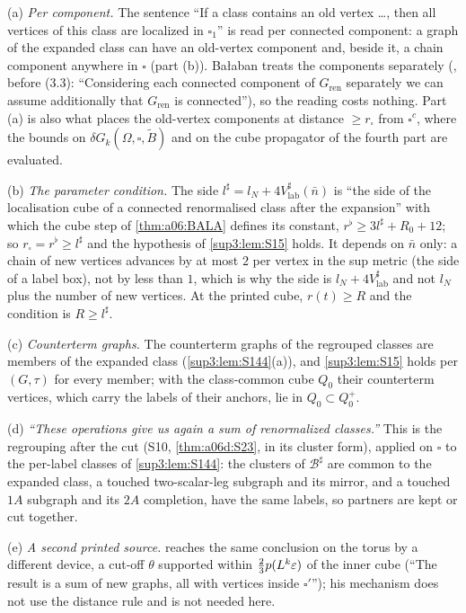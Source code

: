 \begin{remark}\label{sup3:rem:S15}
(a) \emph{Per component.} The sentence ``If a class contains an old vertex \dots, then all vertices of this class are localized in $\square_1$'' is read per connected component: a graph of the expanded class can have an old-vertex component and, beside it, a chain component anywhere in $\square$ (part (b)). Ba{\l}aban treats the components separately (\cite[p.~433]{Ba3}, before (3.3): ``Considering each connected component of $G_{\mathrm{ren}}$ separately we can assume additionally that $G_{\mathrm{ren}}$ is connected''), so the reading costs nothing. Part (a) is also what places the old-vertex components at distance $\ge r_\square$ from $\square^c$, where the bounds on $\delta G_k(\Omega,\square,\tilde B)$ and on the cube propagator of the fourth part are evaluated.

(b) \emph{The parameter condition.} The side $l^\sharp=l_N+4V^\sharp_{\mathrm{lab}}(\bar n)$ is ``the side of the localisation cube of a connected renormalised class after the expansion'' with which the cube step of \cref{thm:a06:BALA} defines its constant, $r^\flat\ge3l^\sharp+R_0+12$; so $r_\square=r^\flat\ge l^\sharp$ and the hypothesis of \cref{sup3:lem:S15} holds. It depends on $\bar n$ only: a chain of new vertices advances by at most $2$ per vertex in the sup metric (the side of a label box), not by less than $1$, which is why the side is $l_N+4V^\sharp_{\mathrm{lab}}$ and not $l_N$ plus the number of new vertices. At the printed cube, $r(t)\ge R$ and the condition is $R\ge l^\sharp$.

(c) \emph{Counterterm graphs.} The counterterm graphs of the regrouped classes are members of the expanded class (\cref{sup3:lem:S144}(a)), and \cref{sup3:lem:S15} holds per $(G,\tau)$ for every member; with the class-common cube $Q_0$ their counterterm vertices, which carry the labels of their anchors, lie in $Q_0\subset Q_0^+$.

(d) \emph{``These operations give us again a sum of renormalized classes.''} This is the regrouping after the cut (S10, \cref{thm:a06d:S23}, in its cluster form), applied on $\square$ to the per-label classes of \cref{sup3:lem:S144}: the clusters of $\mathcal B^\sharp$ are common to the expanded class, a touched two-scalar-leg subgraph and its mirror, and a touched $1A$ subgraph and its $2A$ completion, have the same labels, so partners are kept or cut together.

(e) \emph{A second printed source.} \cite[Sect.~3.4]{K1} reaches the same conclusion on the torus by a different device, a cut-off $\theta$ supported within $\frac23p(L^k\varepsilon)$ of the inner cube (``The result is a sum of new graphs, all with vertices inside $\square'$''); his mechanism does not use the distance rule and is not needed here.
\end{remark}
